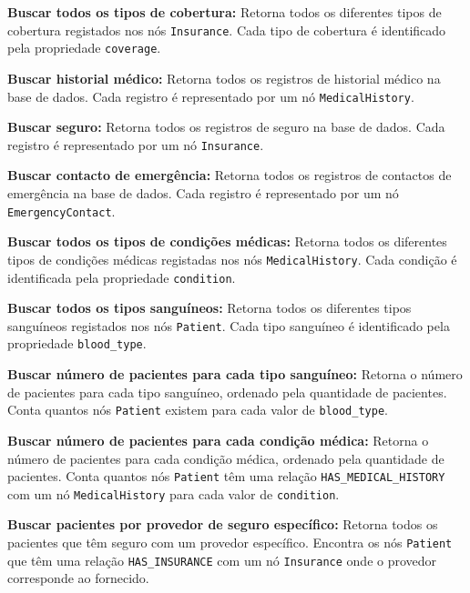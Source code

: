 \vspace{0.15cm} 
\textbf{Buscar todos os tipos de cobertura:} Retorna todos os diferentes tipos de cobertura registados nos nós \texttt{Insurance}. Cada tipo de cobertura é identificado pela propriedade \texttt{coverage}.

\vspace{0.15cm} 
\textbf{Buscar historial médico:} Retorna todos os registros de historial médico na base de dados. Cada registro é representado por um nó \texttt{MedicalHistory}.

\vspace{0.15cm} 
\textbf{Buscar seguro:} Retorna todos os registros de seguro na base de dados. Cada registro é representado por um nó \texttt{Insurance}.

\vspace{0.15cm}
\textbf{Buscar contacto de emergência:} Retorna todos os registros de contactos de emergência na base de dados. Cada registro é representado por um nó \texttt{EmergencyContact}.

\vspace{0.15cm} 
\textbf{Buscar todos os tipos de condições médicas:} Retorna todos os diferentes tipos de condições médicas registadas nos nós \texttt{MedicalHistory}. Cada condição é identificada pela propriedade \texttt{condition}.

\vspace{0.15cm} 
\textbf{Buscar todos os tipos sanguíneos:} Retorna todos os diferentes tipos sanguíneos registados nos nós \texttt{Patient}. Cada tipo sanguíneo é identificado pela propriedade \texttt{blood\_type}.

\vspace{0.15cm} 
\textbf{Buscar número de pacientes para cada tipo sanguíneo:} Retorna o número de pacientes para cada tipo sanguíneo, ordenado pela quantidade de pacientes. Conta quantos nós \texttt{Patient} existem para cada valor de \texttt{blood\_type}.

\vspace{0.15cm} 
\textbf{Buscar número de pacientes para cada condição médica:} Retorna o número de pacientes para cada condição médica, ordenado pela quantidade de pacientes. Conta quantos nós \texttt{Patient} têm uma relação \texttt{HAS\_MEDICAL\_HISTORY} com um nó \texttt{MedicalHistory} para cada valor de \texttt{condition}.

\vspace{0.15cm} 
\textbf{Buscar pacientes por provedor de seguro específico:} Retorna todos os pacientes que têm seguro com um provedor específico. Encontra os nós \texttt{Patient} que têm uma relação \texttt{HAS\_INSURANCE} com um nó \texttt{Insurance} onde o provedor corresponde ao fornecido.

